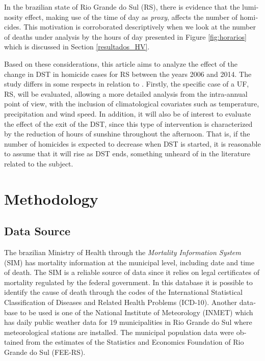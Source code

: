 \documentclass[12pt,openright,oneside,a4paper,english,french,spanish]{abntex2}
\numberwithin{table}{section} %
\numberwithin{figure}{section} %
\newcommand{\co}{\citeonline}
\begin{document}
\begin{otherlanguage}{english}
In the brazilian state of Rio Grande do Sul (RS), there is evidence that the luminosity effect, making use of the time of day as \textit{proxy}, affects the number of homicides. This motivation is corroborated descriptively when we look at the number of deaths under analysis by the hours of day presented in Figure \ref{fig:horarios} which is discussed in Section \ref{resultados_HV}.

Based on these considerations, this article aims to analyze the effect of the change in DST in homicide cases for RS between the years 2006 and 2014. The study differs in some respects in relation to \co{toro2016}. Firstly, the specific case of a UF, RS, will be evaluated, allowing a more detailed analysis from the intra-annual point of view, with the inclusion of climatological covariates such as temperature, precipitation and wind speed. In addition, it will also be of interest to evaluate the effect of the exit of the DST, since this type of intervention is characterized by the reduction of hours of sunshine throughout the afternoon. That is, if the number of homicides is expected to decrease when DST is started, it is reasonable to assume that it will rise as DST ends, something unheard of in the literature related to the subject.



\section{Methodology\label{metodologia_HV}}

\subsection{Data Source\label{fonte_de_dados_HV}}

The brazilian Ministry of Health through the \textit{Mortality Information System} (SIM) has mortality information at the municipal level, including date and time of death. The SIM is a reliable source of data since it relies on legal certificates of mortality regulated by the federal government. In this database it is possible to identify the cause of death through the codes of the International Statistical Classification of Diseases and Related Health Problems (ICD-10). Another database to be used is one of the National Institute of Meteorology (INMET) which has daily public weather data for 19 municipalities in Rio Grande do Sul where meteorological stations are installed. The municipal population data were obtained from the estimates of the Statistics and Economics Foundation of Rio Grande do Sul (FEE-RS).


\end{otherlanguage}
\end{document}
